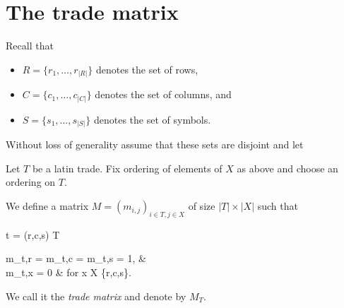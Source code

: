 \section{The trade matrix}
Recall that
\begin{itemize}
	\item $R = \{r_1,\dots,r_{|R|}\}$ denotes the set of rows,
	\item $C = \{c_1,\dots,c_{|C|}\}$ denotes the set of columns, and
	\item $S = \{s_1,\dots,s_{|S|}\}$ denotes the set of symbols.
\end{itemize}
Without loss of generality assume that these sets are disjoint and let
%

\begin{defn}
Let $T$ be a latin trade. Fix ordering of elements of $X$ as above and choose an ordering on $T$.

We define a matrix $M = (m_{i,j})_{i \in T, j \in X}$ of size $|T| \times |X|$ such that
\begin{cosyeqnarray}
	t = (r,c,s) \in T \Rightarrow
	\begin{cases}
		m_{t,r} = m_{t,c} = m_{t,s} = 1, & \\
		m_{t,x} = 0 & \textrm{ for } x \in X \setminus \{r,c,s\}.
	\end{cases}
\end{cosyeqnarray}%
\end{defn}
We call it the \emph{trade matrix} and denote by $M_T$.

